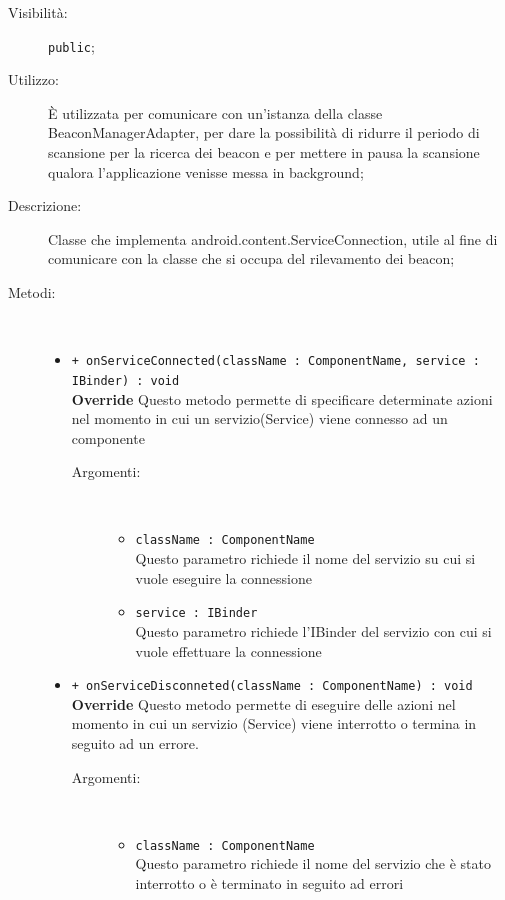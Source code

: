 \documentclass[../DefinizioneDiProdotto.tex]{subfiles}
\begin{document}
\begin{description}
\begin{itemize}
	\end{itemize}
	\item[Visibilità:] \texttt{public};
	\item[Utilizzo:] È utilizzata per comunicare con un'istanza della classe BeaconManagerAdapter, per dare la possibilità di ridurre il periodo di scansione per la ricerca dei beacon e per mettere in pausa la scansione qualora l'applicazione venisse messa in background;
	\item[Descrizione:] Classe che implementa android.content.ServiceConnection, utile al fine di comunicare con la classe che si occupa del rilevamento dei beacon;
	\item[Metodi:] \
	\begin{itemize}
		\item \texttt{+ onServiceConnected(className : ComponentName, service : IBinder) : void}\\
		\textbf{Override} Questo metodo permette di specificare determinate azioni nel momento in cui un servizio(Service) viene connesso ad un componente
		\begin{description}
			\item[Argomenti:] \
			\begin{itemize}
				\item \texttt{className : ComponentName}\\
				Questo parametro richiede il nome del servizio su cui si vuole eseguire la connessione\item \texttt{service : IBinder}\\
				Questo parametro richiede l'IBinder del servizio con cui si vuole effettuare la connessione\end{itemize}
		\end{description}
		\item \texttt{+ onServiceDisconneted(className : ComponentName) : void}\\
		\textbf{Override} Questo metodo permette di eseguire delle azioni nel momento in cui un servizio (Service) viene interrotto o termina in seguito ad un errore.
		\begin{description}
			\item[Argomenti:] \
			\begin{itemize}
				\item \texttt{className : ComponentName}\\
				Questo parametro richiede il nome del servizio che è stato interrotto o è terminato in seguito ad errori\end{itemize}
		\end{description}
	\end{itemize}
\end{description}
\end{document}
